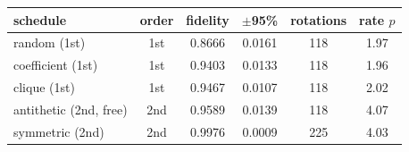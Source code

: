 \begin{tabular}{lccccc}
\toprule
schedule & order & fidelity & $\pm$95\% & rotations & rate $p$ \\
\midrule
random (1st) & 1st & 0.8666 & 0.0161 & 118 & 1.97 \\
coefficient (1st) & 1st & 0.9403 & 0.0133 & 118 & 1.96 \\
clique (1st) & 1st & 0.9467 & 0.0107 & 118 & 2.02 \\
antithetic (2nd, free) & 2nd & 0.9589 & 0.0139 & 118 & 4.07 \\
symmetric (2nd) & 2nd & 0.9976 & 0.0009 & 225 & 4.03 \\
\bottomrule
\end{tabular}
